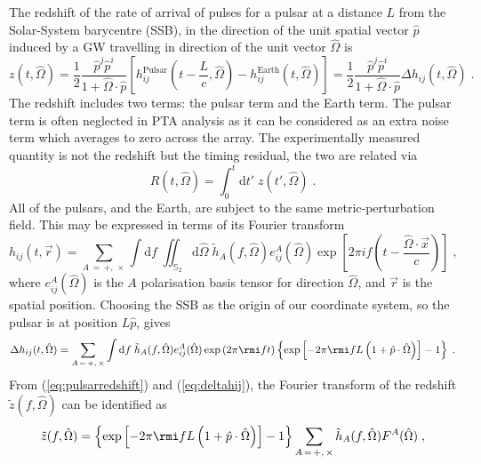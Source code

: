The redshift of the rate of arrival of pulses for a pulsar at a distance $L$ from the Solar-System barycentre (SSB), in the direction of the unit spatial vector $\hat{p}$ induced by a GW travelling in direction of the unit vector $\hat{\Omega}$ is \citep{anholm-2009}
\begin{equation}\label{eq:pulsarredshift}
z(t,\hat{\Omega})= \frac{1}{2} \frac{\hat{p}^{j}\hat{p}^{i}} {1+\hat{\Omega}\cdot\hat{p}}\left[h_{ij}^{\mathrm{Pulsar}}\left(t-\frac{L}{c},\hat{\Omega} \right)-h_{ij}^{\mathrm{Earth}}(t,\hat{\Omega} )\right] = \frac{1}{2}\frac{\hat{p}^{j}\hat{p}^{i}}{1+\hat{\Omega}\cdot\hat{p}} \Delta h_{ij}(t,\hat{\Omega})\; .
\end{equation}
The redshift includes two terms: the pulsar term and the Earth term. The pulsar term is often neglected in PTA analysis as it can be considered as an extra noise term which averages to zero across the array. The experimentally measured quantity is not the redshift but the timing residual, the two are related via
\begin{equation}\label{eq:restored}
R(t,\hat{\Omega}) = \int_{0}^{t}\mathrm{d}t'\;z(t',\hat{\Omega}) \; .
\end{equation}
All of the pulsars, and the Earth, are subject to the same metric-perturbation field. This may be expressed in terms of its Fourier transform
\begin{equation}
h_{ij}(t,\vec{r}) = \sum_{A\,=\,+,\,\times}\int\mathrm{d}f\;\iint_{\mathbb{S}_{2}}\mathrm{d}\hat{\Omega}\; \tilde{h}_{A}(f,\hat{\Omega})e_{ij}^{A}(\hat{\Omega}) \exp\left[2\pi i f \left(t-\frac{\hat{\Omega}\cdot\vec{x}}{c}\right)\right] \; ,
\end{equation}
where $e^{A}_{ij}(\hat{\Omega})$ is the $A$ polarisation basis tensor for direction $\hat{\Omega}$, and $\vec{r}$ is the spatial position. Choosing the SSB as the origin of our coordinate system, so the pulsar is at position $L\hat{p}$, gives
\begin{equation}\label{eq:deltahij}
\Delta h_{ij}(t,\hat{\Omega}) = \sum_{A\,=\,+,\,\times}\int\mathrm{d}f\; \tilde{h}_{A}(f,\hat{\Omega})e_{ij}^{A}(\hat{\Omega})\exp\left(2\pi \rmi f t\right)\left\{\exp\left[-2\pi\rmi fL \left(1+\hat{p}\cdot\hat{\Omega}\right)\right]-1\right\} \; .
\end{equation}
From (\ref{eq:pulsarredshift}) and (\ref{eq:deltahij}), the Fourier transform of the redshift $\tilde{z}(f,\hat{\Omega})$ can be identified as
\begin{equation}\label{eq:45}
\tilde{z}(f,\hat{\Omega}) = \left\{\exp\left[-2\pi\rmi fL \left(1+\hat{p}\cdot\hat{\Omega}\right)\right]-1\right\} \sum_{A\,=\,+,\,\times} \tilde{h}_{A}(f,\hat{\Omega})F^{A}(\hat{\Omega}) \; ,
\end{equation}
